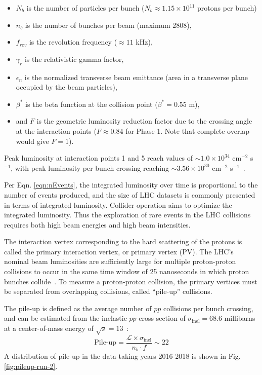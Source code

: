 \begin{itemize}
    \item $N_b$ is the number of particles per bunch ($N_b \approx 1.15 \times 10^{11}$ protons per bunch)
    \item $n_b$ is the number of bunches per beam (maximum 2808),
    \item $f_{rev}$ is the revolution frequency ($\approx 11$ kHz),
    \item $\gamma_r$ is the relativistic gamma factor,
    \item $\epsilon_n$ is the normalized transverse beam emittance (area in a transverse plane occupied by the beam particles),
    \item $\beta^*$ is the beta function at the collision point ($\beta^* = 0.55$ m),
    \item and $F$ is the geometric luminosity reduction factor due to the crossing angle at the interaction points ($F \approx 0.84$ for Phase-1. Note that complete overlap would give $F = 1$).
\end{itemize}
Peak luminosity at interaction points 1 and 5 reach values of $\sim 1.0 \times 10^{34}$ cm$^{-2}$ s$^{-1}$, with peak luminosity per bunch crossing reaching $\sim 3.56 \times 10^{30}$ cm$^{-2}$ s$^{-1}$~\cite{LHC-phase-1-design-report}.

Per Eqn. \ref{eqn:nEvents}, the integrated luminosity over time is proportional to the number of events produced, and the size of LHC datasets is commonly presented in terms of integrated luminosity. Collider operation aims to optimize the integrated luminosity. Thus the exploration of rare events in the LHC collisions requires both high beam energies and high beam intensities.

The interaction vertex corresponding to the hard scattering of the protons is called the primary interaction vertex, or primary vertex (PV). The LHC's nominal beam luminosities are sufficiently large for multiple proton-proton collisions to occur in the same time window of 25 nanoseconds in which proton bunches collide~\cite{CMS-JME-18-001}. To measure a proton-proton collision, the primary vertices must be separated from overlapping collisions, called ``pile-up'' collisions. 

The pile-up is defined as the average number of $pp$ collisions per bunch crossing, and can be estimated from the inelastic $pp$ cross section of $\sigma_{\text{inel}} = 68.6$ millibarns at a center-of-mass energy of $\sqrt{s} = 13$\TeV~\cite{CERN-EP-2018-004-pileup}:
\begin{equation}
    \text{Pile-up} = \frac{\mathcal{L} \times \sigma_{\text{inel}}}{ n_b \cdot f} \sim 22
\end{equation}
A distribution of pile-up in the data-taking years 2016-2018 is shown in Fig. \ref{fig:pileup-run-2}.

